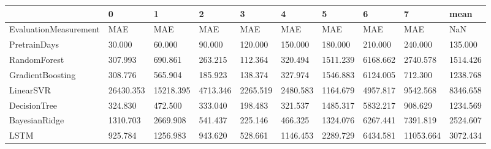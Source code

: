 \begin{tabular}{llllllllll}
\toprule
{} &         0 &         1 &        2 &        3 &        4 &        5 &        6 &         7 &     mean \\
\midrule
EvaluationMeasurement &       MAE &       MAE &      MAE &      MAE &      MAE &      MAE &      MAE &       MAE &      NaN \\
PretrainDays          &    30.000 &    60.000 &   90.000 &  120.000 &  150.000 &  180.000 &  210.000 &   240.000 &  135.000 \\
RandomForest          &   307.993 &   690.861 &  263.215 &  112.364 &  320.494 & 1511.239 & 6168.662 &  2740.578 & 1514.426 \\
GradientBoosting      &   308.776 &   565.904 &  185.923 &  138.374 &  327.974 & 1546.883 & 6124.005 &   712.300 & 1238.768 \\
LinearSVR             & 26430.353 & 15218.395 & 4713.346 & 2265.519 & 2480.583 & 1164.679 & 4957.817 &  9542.568 & 8346.658 \\
DecisionTree          &   324.830 &   472.500 &  333.040 &  198.483 &  321.537 & 1485.317 & 5832.217 &   908.629 & 1234.569 \\
BayesianRidge         &  1310.703 &  2669.908 &  541.437 &  225.146 &  466.325 & 1324.076 & 6267.441 &  7391.819 & 2524.607 \\
LSTM                  &   925.784 &  1256.983 &  943.620 &  528.661 & 1146.453 & 2289.729 & 6434.581 & 11053.664 & 3072.434 \\
\bottomrule
\end{tabular}
